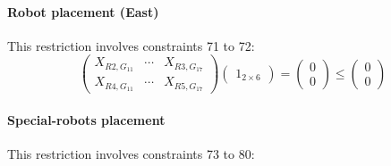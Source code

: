 \paragraph{Robot placement (East)}
This restriction involves constraints 71 to 72:
\begin{equation}
    \begin{pmatrix}
        X_{R2,G_{11}} & \cdots & X_{R3,G_{17}}\\
        X_{R4,G_{11}} & \cdots & X_{R5,G_{17}}
    \end{pmatrix}
    \begin{pmatrix}
        1_{2 \times 6}
    \end{pmatrix}
    =
    \begin{pmatrix}
        0\\
        0
    \end{pmatrix}
    \leq
    \begin{pmatrix}
        0\\
        0
    \end{pmatrix}
\end{equation}





\paragraph{Special-robots placement}
This restriction involves constraints 73 to 80:

